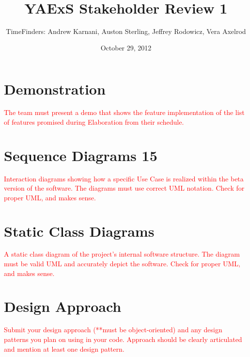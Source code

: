 \documentclass[11pt]{article}
\title{\bf YAExS Stakeholder Review 1}
\author{TimeFinders: Andrew Karnani, Auston Sterling, Jeffrey Rodowicz, Vera Axelrod}
\date{October 29, 2012}
\begin{document}
\maketitle

\section*{Demonstration}
\textcolor{red}{
The team must present a demo that shows the feature implementation of the list of features promised during Elaboration from their schedule.}



\section*{Sequence Diagrams 15}
\textcolor{red}{
Interaction diagrams showing how a specific Use Case is realized within the beta version of the software. The diagrams must use correct UML notation.  Check for proper UML, and makes sense.}



\section*{Static Class Diagrams}
\textcolor{red}{
A static class diagram of the project's internal software structure. The diagram must be valid UML and accurately depict the software.  Check for proper UML, and makes sense.}




\section*{ Design Approach}
\textcolor{red}{
Submit your design approach (**must be object-oriented) and any design patterns you plan on using in your code. Approach should be clearly articulated and mention at least one design pattern.}


\end{document}
